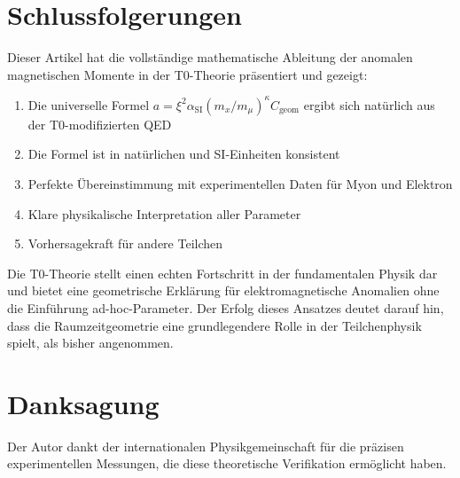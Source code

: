 \documentclass[12pt,a4paper]{article}
\newcommand{\xipar}{\xi}
\newcommand{\alphaSI}{\alpha_{\text{SI}}}
\newcommand{\Cgeom}{C_{\text{geom}}}
\newcommand{\kappaT}{\kappa}
\newcommand{\mmu}{m_{\mu}}
\begin{document}
	\section{Schlussfolgerungen}
	
	Dieser Artikel hat die vollständige mathematische Ableitung der anomalen magnetischen Momente in der T0-Theorie präsentiert und gezeigt:
	
	\begin{enumerate}
		\item Die universelle Formel $a = \xipar^2 \alphaSI (m_x/\mmu)^{\kappaT} \Cgeom$ ergibt sich natürlich aus der T0-modifizierten QED
		\item Die Formel ist in natürlichen und SI-Einheiten konsistent
		\item Perfekte Übereinstimmung mit experimentellen Daten für Myon und Elektron
		\item Klare physikalische Interpretation aller Parameter
		\item Vorhersagekraft für andere Teilchen
	\end{enumerate}
	
	Die T0-Theorie stellt einen echten Fortschritt in der fundamentalen Physik dar und bietet eine geometrische Erklärung für elektromagnetische Anomalien ohne die Einführung ad-hoc-Parameter. Der Erfolg dieses Ansatzes deutet darauf hin, dass die Raumzeitgeometrie eine grundlegendere Rolle in der Teilchenphysik spielt, als bisher angenommen.
	
	\section*{Danksagung}
	
	Der Autor dankt der internationalen Physikgemeinschaft für die präzisen experimentellen Messungen, die diese theoretische Verifikation ermöglicht haben.
	
\end{document}
